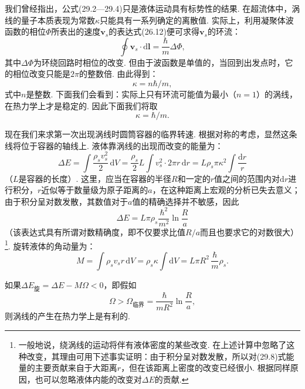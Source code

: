 我们曾经指出，公式(29.2—29.4)只是液体运动具有标势性的结果. 在超流体中，涡线的量子本质表现为常数$\kappa$只能具有一系列确定的离散值. 实际上，利用凝聚体波函数的相位$\Phi$所表出的速度$\bm{v}_{s}$的表达式(26.12)便可求得$\bm{v}_{s}$的环流：
\begin{equation}
\oint\bm{v}_{s}\cdot\mathrm{d}\bm{l}=\frac{\hbar}{m}\Delta\Phi,
\label{29.5}
\end{equation}
其中$\Delta\Phi$为环绕回路时相位的改变. 但由于波函数是单值的，当回到出发点时，它的相位改变只能是$2\pi$的整数倍. 由此得到：
\begin{equation}
\kappa=n\hbar/m,
\label{29.6}
\end{equation}
式中$n$是整数. 下面我们会看到：实际上只有环流可能值为最小（$n=1$）的涡线，在热力学上才是稳定的. 因此下面我们将取
\begin{equation}
\kappa=\hbar/m.
\label{29.7}
\end{equation}

现在我们来求第一次出现涡线时圆筒容器的临界转速. 根据对称的考虑，显然这条线将位于容器的轴线上. 液体靠涡线的出现而改变的能量为：
\begin{equation*}
\Delta E=\int\frac{\rho_{s}v_{s}^{2}}{2}\,\mathrm{d}V
=\frac{\rho_{s}}{2}L\int v_{s}^{2}\cdot2\pi r\,\mathrm{d}r
=L\rho_{s}\pi\kappa^{2}\int\frac{\mathrm{d}r}{r}
\end{equation*}
（$L$是容器的长度）. 这里，应当在容器的半径$R$和一定的$r$值之间的范围内对$\mathrm{d}r$进行积分，$r$近似等于数量级为原子距离的$a$，在这种距离上宏观的分析已失去意义；由于积分呈对数发散，其数值对于$a$值的精确选择并不敏感，因此
\begin{equation}
\Delta E=L\pi\rho_{s}\frac{\hbar^{2}}{m^{2}}\ln\frac{R}{a}
\label{29.8}
\end{equation}
（该表达式具有所谓对数精确度，即不仅要求比值$R/a$而且也要求它的对数很大）\footnote{一般地说，绕涡线的运动将伴有液体密度的某些改变. 在上述计算中忽略了这种改变，其理由可用下述事实证明：由于积分呈对数发散，所以对(29.8)式能量的主要贡献来自于大距离$r$，但在该距离上密度的改变已经很小. 根据同样原因，也可以忽略液体内能的改变对$\Delta E$的贡献.}. 旋转液体的角动量为：
\begin{equation}
M=\int\rho_{s}v_{s}r\,\mathrm{d}V=\rho_{s}\kappa\int\mathrm{d}V
=L\pi R^{2}\,\frac{\hbar}{m}\rho_{s}.
\label{29.9}
\end{equation}

如果$\Delta E_{\text{旋}}=\Delta E-M\varOmega<0$，即假如
\begin{equation}
\varOmega>\varOmega_{\text{临界}}=\frac{\hbar}{mR^{2}}\ln\frac{R}{a},
\label{29.10}
\end{equation}
则涡线的产生在热力学上是有利的.

